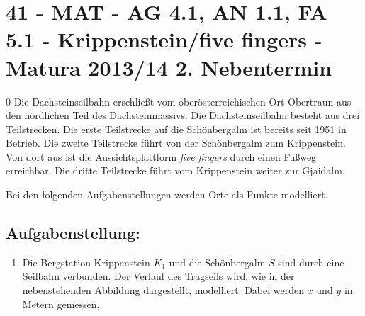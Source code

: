 \section{41 - MAT - AG 4.1, AN 1.1, FA 5.1  - Krippenstein/five fingers - Matura 2013/14 2. Nebentermin}

\begin{langesbeispiel} \item[0] %
				Die Dachsteinseilbahn erschließt vom oberösterreichischen Ort Obertraun aus den nördlichen Teil des Dachsteinmassivs. Die Dachsteinseilbahn besteht aus drei Teilstrecken. Die erste Teilstrecke auf die Schönbergalm ist bereits seit 1951 in Betrieb. Die zweite Teilstrecke führt von der Schönbergalm zum Krippenstein. Von dort aus ist die Aussichtsplattform \textit{five fingers} durch einen Fußweg erreichbar. Die dritte Teilstrecke führt vom Krippenstein weiter zur Gjaidalm. 
				
				Bei den folgenden Aufgabenstellungen werden Orte als Punkte modelliert. 

\subsection{Aufgabenstellung:}
\begin{enumerate}
	\item Die Bergstation Krippenstein $K_1$ und die Schönbergalm $S$ sind durch eine Seilbahn verbunden. Der Verlauf des Tragseils wird, wie in der nebenstehenden Abbildung dargestellt, modelliert. Dabei werden $x$ und $y$ in Metern gemessen.
	
	
	\begin{center}
	\end{center}
	

\end{enumerate}
\end{langesbeispiel}
